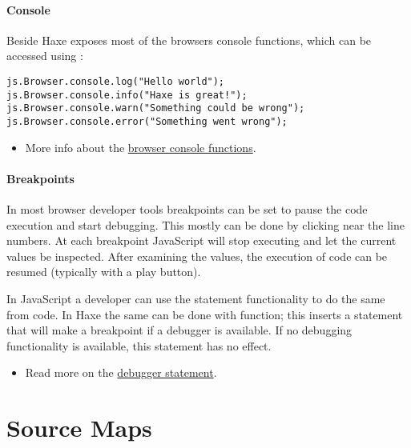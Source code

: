 \paragraph{Console}

Beside  Haxe exposes most of the browsers console functions, which can be accessed using \href{http://api.haxe.org/v/dev/js/html/Console.html}{}:

\begin{lstlisting}
js.Browser.console.log("Hello world"); 
js.Browser.console.info("Haxe is great!"); 
js.Browser.console.warn("Something could be wrong"); 
js.Browser.console.error("Something went wrong"); 
\end{lstlisting}


\begin{itemize}
	\item More info about the \href{https://developer.mozilla.org/en-US/docs/Web/API/Console}{browser console functions}.
\end{itemize}

\paragraph{Breakpoints}

In most browser developer tools breakpoints can be set to pause the code execution and start debugging. This mostly can be done by clicking near the line numbers. At each breakpoint JavaScript will stop executing and let the current values be inspected. After examining the values, the execution of code can be resumed (typically with a play button).

In JavaScript a developer can use the  statement functionality to do the same from code.
In Haxe the same can be done with \href{http://api.haxe.org/v/js/Lib.html#debug}{} function; this inserts a  statement that will make a breakpoint if a debugger is available. If no debugging functionality is available, this statement has no effect. 

\begin{itemize}
	\item Read more on the \href{https://developer.mozilla.org/en/docs/Web/JavaScript/Reference/Statements/debugger}{debugger statement}.
\end{itemize}


\section{Source Maps}
\label{debugging-sourcemap}

